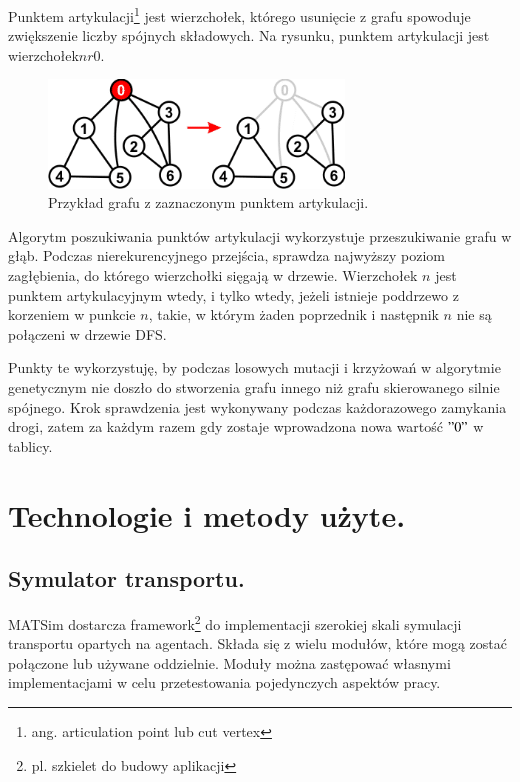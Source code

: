\documentclass[twoside,12pt]{report}
\let\oldsection\chapter
\def\chapter{\cleardoublepage\oldsection}
\begin{document}
Punktem artykulacji\footnote{ang. articulation point lub cut vertex} jest wierzchołek, którego usunięcie z grafu spowoduje zwiększenie liczby spójnych składowych. Na rysunku, punktem artykulacji jest wierzchołek$nr 0$.

\begin{figure}[h]
\begin{center}
\includegraphics[width=0.7\textwidth]{img/articulation}
\caption{Przykład grafu z zaznaczonym punktem artykulacji.}
\end{center}
\end{figure}

Algorytm poszukiwania punktów artykulacji wykorzystuje przeszukiwanie grafu w głąb. Podczas nierekurencyjnego przejścia, sprawdza najwyższy poziom zagłębienia, do którego wierzchołki sięgają w drzewie. Wierzchołek $n$ jest punktem artykulacyjnym wtedy, i tylko wtedy, jeżeli istnieje poddrzewo z korzeniem w punkcie $n$, takie, w którym żaden poprzednik i następnik $n$ nie są połączeni w drzewie DFS. 

Punkty te wykorzystuję, by podczas losowych mutacji i krzyżowań w algorytmie genetycznym nie doszło do stworzenia grafu innego niż grafu skierowanego silnie spójnego. Krok sprawdzenia jest wykonywany podczas każdorazowego zamykania drogi, zatem za każdym razem gdy zostaje wprowadzona nowa wartość $"0"$ w tablicy.

\chapter{Technologie i metody użyte.}\label{rozdz.technologie} 
\section{Symulator transportu.}

MATSim dostarcza framework\footnote{pl. szkielet do budowy aplikacji} do implementacji szerokiej skali symulacji transportu opartych na agentach. Składa się z wielu modułów, które mogą zostać połączone lub używane oddzielnie. Moduły można zastępować własnymi implementacjami w celu przetestowania pojedynczych aspektów pracy.
\end{document}
